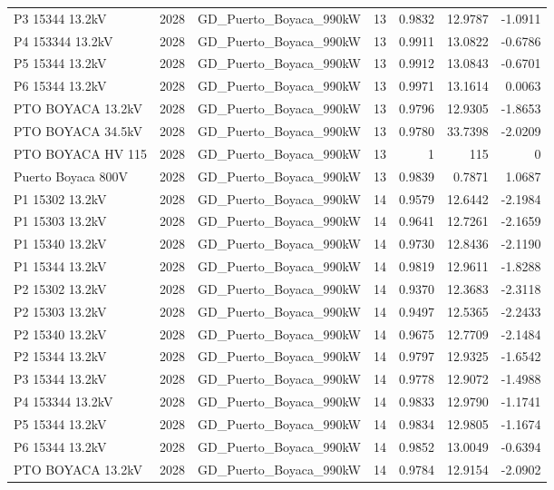 \documentclass[11pt,a4paper]{article}
\begin{document}
\begin{longtable}{llllrrr}
P3 15344 13.2kV & 2028 & GD\_Puerto\_Boyaca\_990kW & 13 & 0.9832 & 12.9787 & -1.0911 \\
P4 153344 13.2kV & 2028 & GD\_Puerto\_Boyaca\_990kW & 13 & 0.9911 & 13.0822 & -0.6786 \\
P5 15344 13.2kV & 2028 & GD\_Puerto\_Boyaca\_990kW & 13 & 0.9912 & 13.0843 & -0.6701 \\
P6 15344 13.2kV & 2028 & GD\_Puerto\_Boyaca\_990kW & 13 & 0.9971 & 13.1614 & 0.0063 \\
PTO BOYACA 13.2kV & 2028 & GD\_Puerto\_Boyaca\_990kW & 13 & 0.9796 & 12.9305 & -1.8653 \\
PTO BOYACA 34.5kV & 2028 & GD\_Puerto\_Boyaca\_990kW & 13 & 0.9780 & 33.7398 & -2.0209 \\
PTO BOYACA HV 115 & 2028 & GD\_Puerto\_Boyaca\_990kW & 13 & 1 & 115 & 0 \\
Puerto Boyaca 800V & 2028 & GD\_Puerto\_Boyaca\_990kW & 13 & 0.9839 & 0.7871 & 1.0687 \\
P1 15302 13.2kV & 2028 & GD\_Puerto\_Boyaca\_990kW & 14 & 0.9579 & 12.6442 & -2.1984 \\
P1 15303 13.2kV & 2028 & GD\_Puerto\_Boyaca\_990kW & 14 & 0.9641 & 12.7261 & -2.1659 \\
P1 15340 13.2kV & 2028 & GD\_Puerto\_Boyaca\_990kW & 14 & 0.9730 & 12.8436 & -2.1190 \\
P1 15344 13.2kV & 2028 & GD\_Puerto\_Boyaca\_990kW & 14 & 0.9819 & 12.9611 & -1.8288 \\
P2 15302 13.2kV & 2028 & GD\_Puerto\_Boyaca\_990kW & 14 & 0.9370 & 12.3683 & -2.3118 \\
P2 15303 13.2kV & 2028 & GD\_Puerto\_Boyaca\_990kW & 14 & 0.9497 & 12.5365 & -2.2433 \\
P2 15340 13.2kV & 2028 & GD\_Puerto\_Boyaca\_990kW & 14 & 0.9675 & 12.7709 & -2.1484 \\
P2 15344 13.2kV & 2028 & GD\_Puerto\_Boyaca\_990kW & 14 & 0.9797 & 12.9325 & -1.6542 \\
P3 15344 13.2kV & 2028 & GD\_Puerto\_Boyaca\_990kW & 14 & 0.9778 & 12.9072 & -1.4988 \\
P4 153344 13.2kV & 2028 & GD\_Puerto\_Boyaca\_990kW & 14 & 0.9833 & 12.9790 & -1.1741 \\
P5 15344 13.2kV & 2028 & GD\_Puerto\_Boyaca\_990kW & 14 & 0.9834 & 12.9805 & -1.1674 \\
P6 15344 13.2kV & 2028 & GD\_Puerto\_Boyaca\_990kW & 14 & 0.9852 & 13.0049 & -0.6394 \\
PTO BOYACA 13.2kV & 2028 & GD\_Puerto\_Boyaca\_990kW & 14 & 0.9784 & 12.9154 & -2.0902 \\

\end{longtable}
\end{document}
